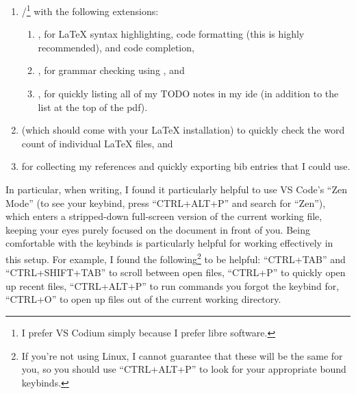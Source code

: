 \begin{enumerate}
    \item {}/\footnote{I prefer VS Codium
              simply because I prefer libre software.} with the following
          extensions:
          \begin{enumerate}
              \item {},
                    for \LaTeX{} syntax highlighting, code formatting (this
                    is highly recommended), and code completion,
              \item {}, for
                    grammar checking using
                    , and
              \item {}, for
                    quickly listing all of my TODO notes in my \acs{ide} (in addition to
                    the list at the top of the \acs{pdf}).
          \end{enumerate}
    \item {} (which
    should come with your \LaTeX{} installation) to quickly check the word count
    of individual \LaTeX{} files, and
    \item {} for collecting my
    references and quickly exporting bib entries that I could use.
\end{enumerate}

In particular, when writing, I found it particularly helpful to use VS Code's
``Zen Mode'' (to see your keybind, press ``CTRL+ALT+P'' and search for ``Zen''),
which enters a stripped-down full-screen version of the current working file,
keeping your eyes purely focused on the document in front of you. Being
comfortable with the keybinds is particularly helpful for working effectively in
this setup. For example, I found the following\footnote{If you're not using
Linux, I cannot guarantee that these will be the same for you, so you should use
``CTRL+ALT+P'' to look for your appropriate bound keybinds.} to be helpful:
``CTRL+TAB'' and ``CTRL+SHIFT+TAB'' to scroll between open files, ``CTRL+P'' to
quickly open up recent files, ``CTRL+ALT+P'' to run commands you forgot the
keybind for, ``CTRL+O'' to open up files out of the current working directory.

